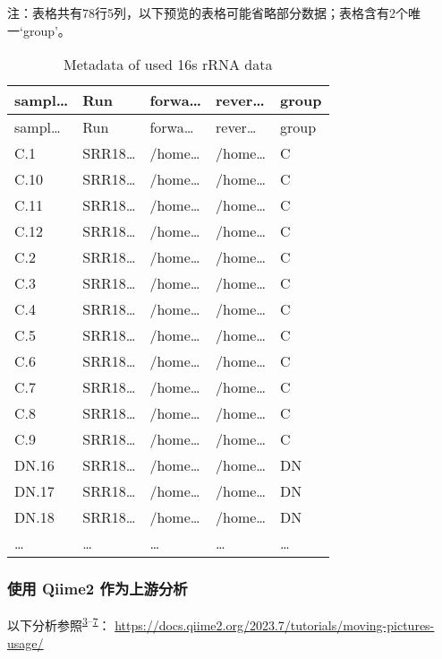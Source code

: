 \documentclass[
]{article}
\begin{document}
\begin{center}\begin{tcolorbox}[colback=gray!10, colframe=gray!50, width=0.9\linewidth, arc=1mm, boxrule=0.5pt]注：表格共有78行5列，以下预览的表格可能省略部分数据；表格含有2个唯一`group'。
\end{tcolorbox}
\end{center}

\begin{longtable}[]{@{}lllll@{}}
\caption{\label{tab:metadata-of-used-16s-rRNA-data}Metadata of used 16s rRNA data}\tabularnewline
\toprule
sampl\ldots{} & Run & forwa\ldots{} & rever\ldots{} & group\tabularnewline
\midrule
\endfirsthead
\toprule
sampl\ldots{} & Run & forwa\ldots{} & rever\ldots{} & group\tabularnewline
\midrule
\endhead
C.1 & SRR18\ldots{} & /home\ldots{} & /home\ldots{} & C\tabularnewline
C.10 & SRR18\ldots{} & /home\ldots{} & /home\ldots{} & C\tabularnewline
C.11 & SRR18\ldots{} & /home\ldots{} & /home\ldots{} & C\tabularnewline
C.12 & SRR18\ldots{} & /home\ldots{} & /home\ldots{} & C\tabularnewline
C.2 & SRR18\ldots{} & /home\ldots{} & /home\ldots{} & C\tabularnewline
C.3 & SRR18\ldots{} & /home\ldots{} & /home\ldots{} & C\tabularnewline
C.4 & SRR18\ldots{} & /home\ldots{} & /home\ldots{} & C\tabularnewline
C.5 & SRR18\ldots{} & /home\ldots{} & /home\ldots{} & C\tabularnewline
C.6 & SRR18\ldots{} & /home\ldots{} & /home\ldots{} & C\tabularnewline
C.7 & SRR18\ldots{} & /home\ldots{} & /home\ldots{} & C\tabularnewline
C.8 & SRR18\ldots{} & /home\ldots{} & /home\ldots{} & C\tabularnewline
C.9 & SRR18\ldots{} & /home\ldots{} & /home\ldots{} & C\tabularnewline
DN.16 & SRR18\ldots{} & /home\ldots{} & /home\ldots{} & DN\tabularnewline
DN.17 & SRR18\ldots{} & /home\ldots{} & /home\ldots{} & DN\tabularnewline
DN.18 & SRR18\ldots{} & /home\ldots{} & /home\ldots{} & DN\tabularnewline
\ldots{} & \ldots{} & \ldots{} & \ldots{} & \ldots{}\tabularnewline
\bottomrule
\end{longtable}

\hypertarget{ux4f7fux7528-qiime2-ux4f5cux4e3aux4e0aux6e38ux5206ux6790}{%
\subsubsection{使用 Qiime2 作为上游分析}\label{ux4f7fux7528-qiime2-ux4f5cux4e3aux4e0aux6e38ux5206ux6790}}

以下分析参照\textsuperscript{\protect\hyperlink{ref-ReproducibleIBolyen2019}{3}--\protect\hyperlink{ref-MicrobialCommuHamday2009}{7}}： \url{https://docs.qiime2.org/2023.7/tutorials/moving-pictures-usage/}
\end{document}
